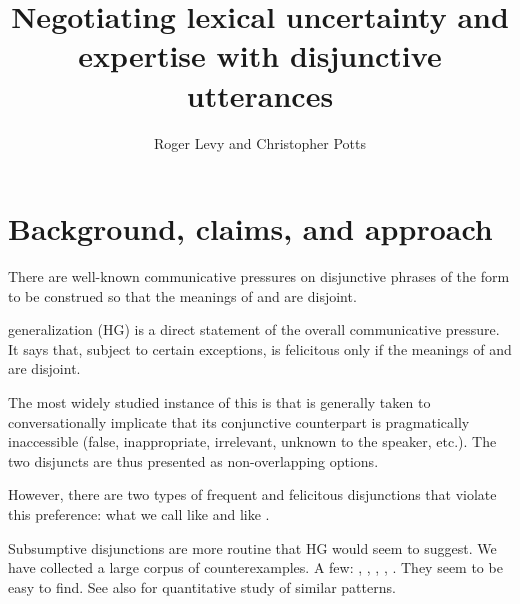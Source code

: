 \documentclass{article}
\begin{document}

\title{Negotiating lexical uncertainty and expertise with disjunctive utterances}
\author{Roger Levy and Christopher Potts}
\maketitle


\section{Background, claims, and approach}\label{sec:introduction}

\begin{examples}

\item There are well-known communicative pressures on disjunctive
  phrases of the form  to be construed so that the
  meanings of  and  are disjoint.

\item {} generalization (HG) is a direct
  statement of the overall communicative pressure. It says that,
  subject to certain exceptions,  is felicitous only if
  the meanings of  and  are disjoint.

\item The most widely studied instance of this is that 
  is generally taken to conversationally implicate that its
  conjunctive counterpart  is pragmatically inaccessible
  (false, inappropriate, irrelevant, unknown to the speaker,
  etc.). The two disjuncts are thus presented as non-overlapping
  options.

\item However, there are two types of frequent and felicitous
  disjunctions that violate this preference: what we call
   like  and
   like 
  \citep{Horn89,Rohdenburg:1985}.

\item Subsumptive disjunctions are more routine that HG would seem to
  suggest. We have collected a large corpus of counterexamples. A few:
  , , , , .
  They seem to be easy to find.  See also \citet{Chemla-HurfordCounts}
  for quantitative study of similar patterns.


\end{examples}
\end{document}

